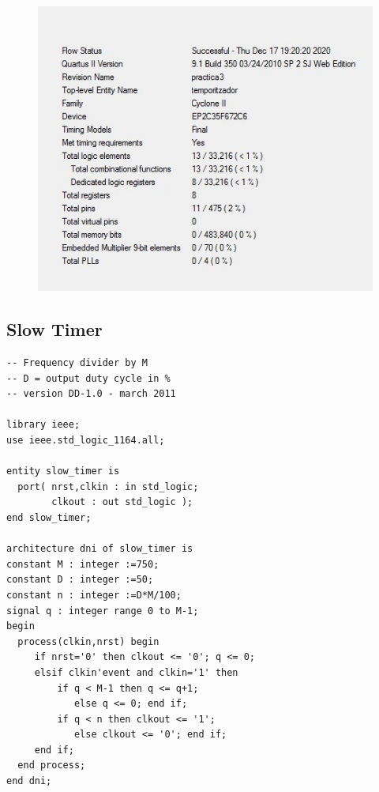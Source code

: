 \documentclass[12pt, a4papre]{article}
\begin{document}
	
			\begin{figure}[H]
			
				\begin{center}
		\includegraphics[width=130mm]{informeTemporitzador.jpeg}
		\end{center}
	\end{figure}
	
	
\subsection{Slow Timer}
\begin{lstlisting}[style=vhdl, frame=single, basicstyle=\tiny]
	-- Frequency divider by M
-- D = output duty cycle in %
-- version DD-1.0 - march 2011

library ieee;
use ieee.std_logic_1164.all;

entity slow_timer is 
  port( nrst,clkin : in std_logic; 
        clkout : out std_logic );
end slow_timer;

architecture dni of slow_timer is
constant M : integer :=750;
constant D : integer :=50;
constant n : integer :=D*M/100;
signal q : integer range 0 to M-1;
begin
  process(clkin,nrst) begin
     if nrst='0' then clkout <= '0'; q <= 0;
     elsif clkin'event and clkin='1' then 
         if q < M-1 then q <= q+1; 
            else q <= 0; end if;
         if q < n then clkout <= '1';
            else clkout <= '0'; end if;
     end if;
  end process;
end dni;
	\end{lstlisting}
	
\end{document}
